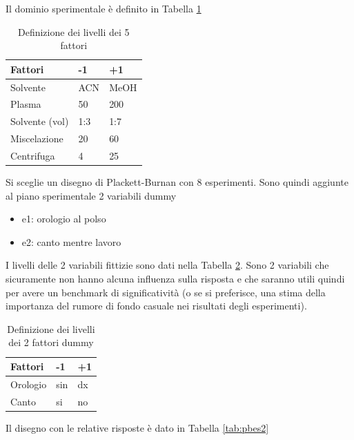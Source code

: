 \documentclass[
  11pt,
]{book}
\providecommand{\tightlist}{%
  \setlength{\itemsep}{0pt}\setlength{\parskip}{0pt}}
\begin{document}
Il dominio sperimentale è definito in Tabella \ref{tab:pbliv1}
\newpage

\begin{table}

\caption{\label{tab:pbliv1}Definizione dei livelli dei 5 fattori}
\centering
\begin{tabular}[t]{lll}
\toprule
Fattori & -1 & +1\\
\midrule
Solvente & ACN & MeOH\\
Plasma & 50 & 200\\
Solvente (vol) & 1:3 & 1:7\\
Miscelazione & 20 & 60\\
Centrifuga & 4 & 25\\
\bottomrule
\end{tabular}
\end{table}

Si sceglie un disegno di Plackett-Burnan con 8 esperimenti. Sono quindi aggiunte al piano sperimentale 2 variabili dummy

\begin{itemize}
\tightlist
\item
  e1: orologio al polso
\item
  e2: canto mentre lavoro
\end{itemize}

I livelli delle 2 variabili fittizie sono dati nella Tabella \ref{tab:dummy1}. Sono 2 variabili che sicuramente non hanno alcuna influenza sulla risposta e che saranno utili quindi per avere un benchmark di significatività (o se si preferisce, una stima della importanza del rumore di fondo casuale nei risultati degli esperimenti).

\begin{table}

\caption{\label{tab:dummy1}Definizione dei livelli dei 2 fattori  dummy}
\centering
\begin{tabular}[t]{lll}
\toprule
Fattori & -1 & +1\\
\midrule
Orologio & sin & dx\\
Canto & si & no\\
\bottomrule
\end{tabular}
\end{table}

Il disegno con le relative risposte è dato in Tabella \ref{tab:pbes2}
\newpage
\end{document}

